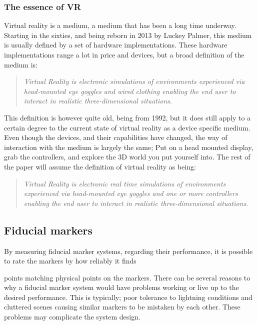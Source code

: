 			\subsubsection{The essence of VR}
				Virtual reality is a medium\cite{definingVirtualReality}, a medium that has been a long time underway. Starting in the sixties, and being reborn in 2013 by Luckey Palmer, this medium is usually defined by a set of hardware implementations. These hardware implementations range a lot in price and devices, but a broad definition of the medium is:\\

					\begin{quote}
						\textit{Virtual Reality is electronic simulations of environments experienced via head-mounted eye goggles and wired clothing enabling the end user to interact in realistic three-dimensional situations}\cite{coates1992}.\\
					\end{quote}

				This definition is however quite old, being from 1992, but it does still apply to a certain degree to the current state of virtual reality as a device specific medium. Even though the devices, and their capabilities have changed, the way of interaction with the medium is largely the same; Put on a head mounted display, grab the controllers, and explore the 3D world you put yourself into. The rest of the paper will assume the definition of virtual reality as being:\\
				\begin{quote}
					\textit{Virtual Reality is electronic real time simulations of environments experienced via head-mounted eye goggles and one or more controllers enabling the end user to interact in realistic three-dimensional situations}\label{def:virtualRealityDefinition}.\\
				\end{quote}
				 

			\subsection{Fiducial markers}\label{sec:fiducialMarkers}
				By measuring fiducial marker systems, regarding their performance, it is possible to rate the markers by how reliably it finds 
				
				 points matching physical points on the markers. There can be several reasons to why a fiducial marker system would have problems working or live up to the desired performance. This is typically; poor tolerance to lightning conditions and cluttered scenes causing similar markers to be mistaken by each other\cite{fiducialMarkers}. These problems may complicate the system design.\\
				
